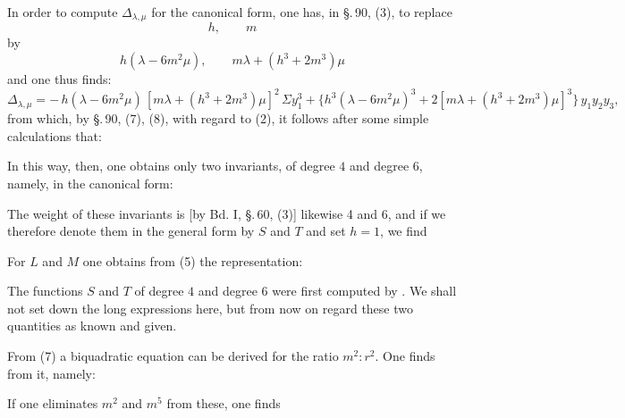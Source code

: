 
In order to compute $\varDelta_{\lambda,\mu}$ for the canonical form, one has,
in \S.\,90, (3), to replace
\[
h, \qquad m
\]
by
\[
h(\lambda-6m^2\mu), \qquad m\lambda+(h^3+2m^3)\mu
\]
and one thus finds:
\[
\varDelta_{\lambda,\mu} = -\,h(\lambda-6m^2\mu)\,[m\lambda+(h^3+2m^3)\mu]^2\,\Sigma y_1^3
+ \{h^3(\lambda-6m^2\mu)^3+2[m\lambda+(h^3+2m^3)\mu]^3\}\,y_1y_2y_3,
\]
from which, by \S.\,90, (7), (8), with regard to (2), it follows after some
simple calculations that:

In this way, then, one obtains only two invariants, of degree
$4$ and degree $6$, namely, in the canonical form:

The weight of these invariants is [by Bd. I, \S.\,60, (3)]
likewise 4 and 6, and if we therefore denote them in the general
form by $S$ and $T$ and set $h=1$, we find

For $L$ and $M$ one obtains from (5) the representation:

The functions $S$ and $T$ of degree $4$ and degree $6$ were
first computed by . We shall not set down the long
expressions here, but from now on regard these two
quantities as known and given.

From (7) a biquadratic equation can be derived
for the ratio $m^2:r^2$. One finds from it, namely:

If one eliminates $m^2$ and $m^5$ from these, one finds
